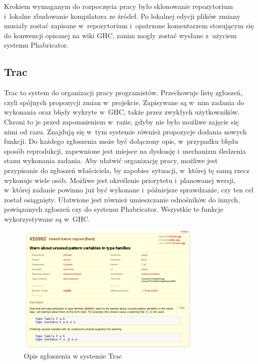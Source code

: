Krokiem wymaganym do rozpoczęcia pracy było sklonowanie repozytorium i~lokalne
zbudowanie kompilatora ze źródeł. Po lokalnej edycji plików zmiany musiały
zostać zapisane w~repozytorium i~opatrzone komentarzem stosującym się do
konwencji opisanej na wiki GHC, zanim mogły zostać wysłane z~użyciem systemu
Phabricator.

\subsection{Trac}

Trac to system do organizacji pracy programistów. Przechowuje listę zgłoszeń,
czyli spójnych propozycji zmian w~projekcie. Zapisywane są w~nim zadania do
wykonania oraz błędy wykryte w~GHC, także przez zwykłych użytkowników. Chroni to
je przed zapomnieniem w~razie, gdyby nie było możliwe zajęcie się nimi od
razu. Znajdują się w~tym systemie również propozycje dodania nowych funkcji. Do
każdego zgłoszenia może być dołączony opis, w~przypadku błędu sposób
reprodukcji, zapewnione jest miejsce na dyskusję i~mechanizm śledzenia stanu
wykonania zadania. Aby ułatwić organizację pracy, możliwe jest przypisanie do zgłoszeń
właściciela, by zapobiec sytuacji, w~której tę samą rzecz wykonuje
wiele osób. Możliwe jest określenie priorytetu i~planowanej wersji, w~której
zadanie powinno już być wykonane i~późniejsze sprawdzanie, czy ten cel został
osiągnięty. Ułatwione jest również umieszczanie odnośników do innych,
powiązanych zgłoszeń czy do systemu Phabricator. Wszystkie te funkcje
wykorzystywane są w~GHC.

\begin{figure}[ht]
    \centering
    \includegraphics[width=0.8\textwidth]{images/Trac_description}
    \caption{Opis zgłoszenia w systemie Trac}
    \label{fig:Trac_description}
\end{figure}

